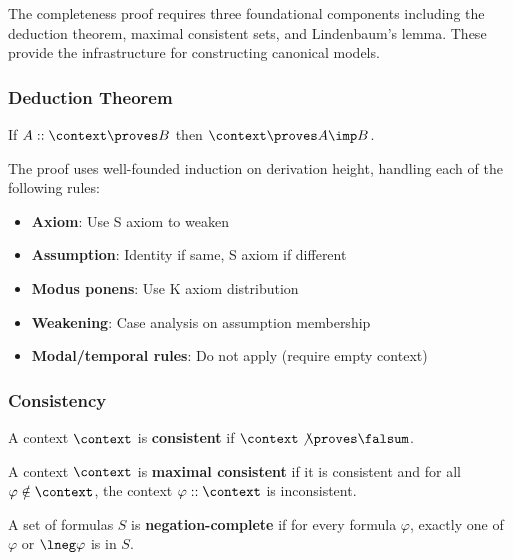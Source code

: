 \documentclass[../BimodalReference.tex]{subfiles}
\begin{document}
The completeness proof requires three foundational components including the deduction theorem, maximal consistent sets, and Lindenbaum's lemma.
These provide the infrastructure for constructing canonical models.

\subsubsection{Deduction Theorem}

\begin{theorem}
If $A :: \context \proves B$ then $\context \proves A \imp B$.
\end{theorem}

The proof uses well-founded induction on derivation height, handling each of the following rules:
\begin{itemize}
  \item \textbf{Axiom}: Use S axiom to weaken
  \item \textbf{Assumption}: Identity if same, S axiom if different
  \item \textbf{Modus ponens}: Use K axiom distribution
  \item \textbf{Weakening}: Case analysis on assumption membership
  \item \textbf{Modal/temporal rules}: Do not apply (require empty context)
\end{itemize}


\subsubsection{Consistency}

\begin{definition}[Consistent]
A context $\context$ is \textbf{consistent} if $\context \not\proves \falsum$.
\end{definition}

\begin{definition}
A context $\context$ is \textbf{maximal consistent} if it is consistent and
for all $\varphi \notin \context$, the context $\varphi :: \context$ is inconsistent.
\end{definition}

\begin{definition}
A set of formulas $S$ is \textbf{negation-complete} if for every formula $\varphi$, exactly one of $\varphi$ or $\lneg\varphi$ is in $S$.
\end{definition}
\end{document}

